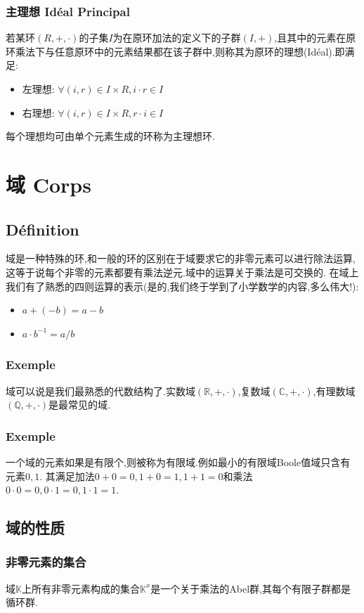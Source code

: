 \documentclass[12pt, a4paper, oneside]{ctexbook}
\begin{document}
  \subsubsection{主理想 Idéal Principal}
  若某环$(R,+,\cdot)$的子集$I$为在原环加法的定义下的子群$(I,+)$,且其中的元素在原环乘法下与任意原环中的元素结果都在该子群中,则称其为原环的理想(Idéal).即满足:
  \begin{itemize}
    \item 左理想: $\forall (i,r)\in I\times R,i\cdot r\in I$
    \item 右理想: $\forall (i,r)\in I\times R,r\cdot i\in I$
  \end{itemize}
  每个理想均可由单个元素生成的环称为主理想环.\\


  \section{域 Corps}
  \subsection{Définition}
  域是一种特殊的环,和一般的环的区别在于域要求它的非零元素可以进行除法运算,这等于说每个非零的元素都要有乘法逆元.域中的运算关于乘法是可交换的.
  在域上我们有了熟悉的四则运算的表示(是的,我们终于学到了小学数学的内容,多么伟大!):
  \begin{itemize}
    \item $  a+(-b)=a-b $
    \item $ a\cdot b^{-1}=a/b$
  \end{itemize}
  \subsubsection{Exemple}
  域可以说是我们最熟悉的代数结构了.实数域$(\mathbb{R},+,\cdot)$,复数域$(\mathbb{C},+,\cdot)$,有理数域$(\mathbb{Q},+,\cdot)$是最常见的域.
  \subsubsection{Exemple}
  一个域的元素如果是有限个,则被称为有限域.例如最小的有限域Boole值域只含有元素$0,1$.
  其满足加法$0+0=0,1+0=1,1+1=0$和乘法$0\cdot 0=0,0\cdot 1=0,1\cdot 1=1$.
  \subsection{域的性质}
  \subsubsection{非零元素的集合}
  域$\mathbb{K}$上所有非零元素构成的集合$\mathbb{K}^x$是一个关于乘法的Abel群,其每个有限子群都是循环群.
\end{document}
